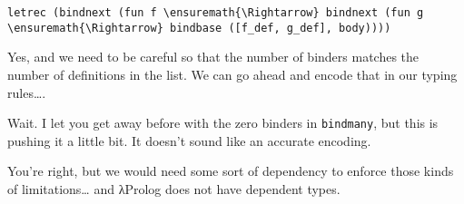 \begin{verbatim}
letrec (bindnext (fun f \ensuremath{\Rightarrow} bindnext (fun g \ensuremath{\Rightarrow} bindbase ([f_def, g_def], body))))
\end{verbatim}

\heroADVISOR{} Yes, and we need to be careful so that the number of binders
matches the number of definitions in the list. We can go ahead and
encode that in our typing rules\ldots{}.

\heroSTUDENT{} Wait. I let you get away before with the zero binders in
\texttt{bindmany}, but this is pushing it a little bit. It doesn't sound
like an accurate encoding.

\heroADVISOR{} You're right, but we would need some sort of dependency to
enforce those kinds of limitations\ldots{} and \foreignlanguage{greek}{λ}Prolog does not have
dependent types.
